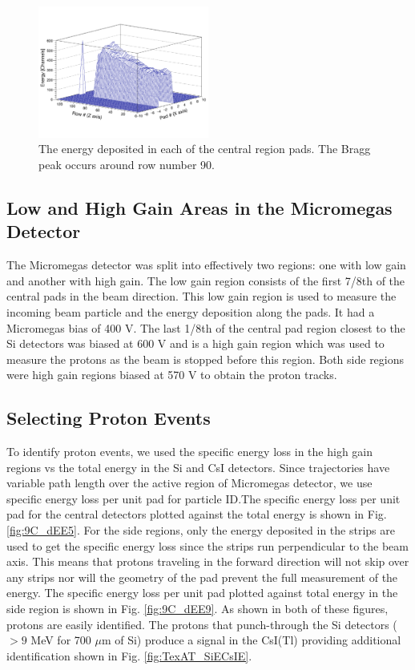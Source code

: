\documentclass[final,number,sort&compress,5p,times,twocolumn]{elsarticle}
\begin{document}
\begin{figure}[hbt!]
	\centering
    \includegraphics[width=0.5\textwidth]{figures/9CBeamEnergy}
    \caption{The energy deposited in each of the central region pads. The Bragg peak occurs around row number 90.}
    \label{fig:9CBeamEnergy}
\end{figure}

\subsection{Low and High Gain Areas in the Micromegas Detector \label{lowANDhigh}}

The Micromegas detector was split into effectively two regions: one with low gain and another with high gain. The low gain region consists of the first 7/8th of the central pads in the beam direction. This low gain region is used to measure the incoming beam particle and the energy deposition along the pads. It had a Micromegas bias of 400 V. The last 1/8th of the central pad region closest to the Si detectors was biased at 600 V and is a high gain region which was used to measure the protons as the beam is stopped before this region. Both side regions were high gain regions biased at 570 V to obtain the proton tracks.

\subsection{Selecting Proton Events}

To identify proton events, we used the specific energy loss in the high gain regions vs the total energy in the Si and CsI detectors. Since trajectories have variable path length over the active region of Micromegas detector, we use specific energy loss per unit pad for particle ID.The specific energy loss per unit pad for the central detectors plotted against the total energy is shown in Fig. \ref{fig:9C_dEE5}. For the side regions, only the energy deposited in the strips are used to get the specific energy loss since the strips run perpendicular to the beam axis. This means that protons traveling in the forward direction will not skip over any strips nor will the geometry of the pad prevent the full measurement of the energy. The specific energy loss per unit pad plotted against total energy in the side region is shown in Fig. \ref{fig:9C_dEE9}. As shown in both of these figures, protons are easily identified. The protons that punch-through the Si detectors ($>9$ MeV for 700 $\mu$m of Si) produce a signal in the CsI(Tl) providing additional identification shown in Fig. \ref{fig:TexAT_SiECsIE}.
\end{document}
